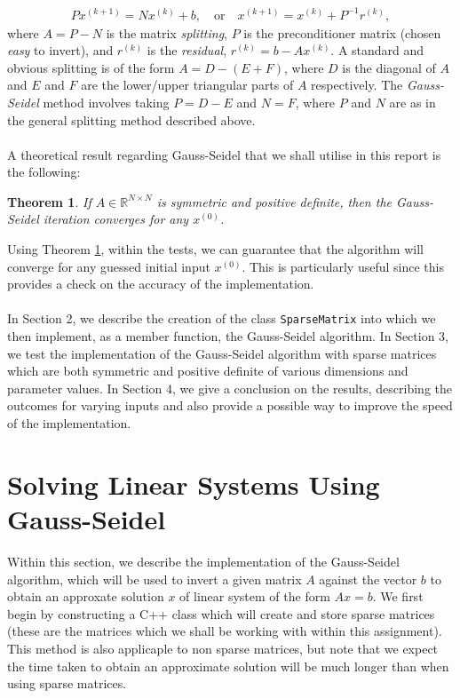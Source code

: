 \documentclass[a4paper,11pt]{article}
\theoremstyle{break}
\theoremstyle{break2}
\theoremstyle{break}
\newtheorem{theorem}{Theorem}[section]
\theoremstyle{break2}
\newcommand{\R}{\mathbb{R}}
\begin{document}
\begin{align*}
P x^{(k+1)} = Nx^{(k)} + b, \quad \text{or} \quad x^{(k+1)} = x^{(k)} + P^{-1}r^{(k)},
\end{align*}
where $ A = P - N $ is the matrix \emph{splitting}, $ P $ is the preconditioner matrix (chosen \emph{easy} to invert), and $ r^{(k)} $ is the \emph{residual}, $ r^{(k)} = b - Ax^{(k)} $. A standard and obvious splitting is of the form $ A = D - (E+F) $, where $ D $ is the diagonal of $ A $ and $ E $ and $ F $ are the lower/upper triangular parts of $ A $ respectively. The \emph{Gauss-Seidel} method involves taking $ P = D - E $ and $ N = F $, where $ P $ and $ N $ are as in the general splitting method described above.\\\\
\noindent
A theoretical result regarding Gauss-Seidel that we shall utilise in this report is the following:
\begin{theorem}\label{Thm:GSConvergence}
	If $ A \in \R^{N \times N} $ is symmetric and positive definite, then the Gauss-Seidel iteration converges for any $ x^{(0)} $.
\end{theorem}
\noindent
Using Theorem \ref{Thm:GSConvergence}, within the tests, we can guarantee that the algorithm will converge for any guessed initial input $ x^{(0)} $. This is particularly useful since this provides a check on the accuracy of the implementation.
\\\\
In Section 2, we describe the creation of the class \texttt{SparseMatrix} into which we then implement, as a member function, the Gauss-Seidel algorithm. In Section 3, we test the implementation of the Gauss-Seidel algorithm with sparse matrices which are both symmetric and positive definite of various dimensions and parameter values. In Section 4, we give a conclusion on the results, describing the outcomes for varying inputs and also provide a possible way to improve the speed of the implementation.

\section{Solving Linear Systems Using Gauss-Seidel}
Within this section, we describe the implementation of the Gauss-Seidel algorithm, which will be used to invert a given matrix $ A $ against the vector $ b $ to obtain an approxate solution $ x $ of linear system of the form $ Ax = b $. We first begin by constructing a C++ class which will create and store sparse matrices (these are the matrices which we shall be working with within this assignment). This method is also applicaple to non sparse matrices, but note that we expect the time taken to obtain an approximate solution will be much longer than when using sparse matrices.
\end{document}
